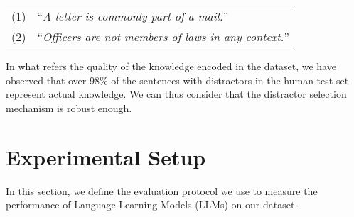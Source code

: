 \documentclass[11pt]{article}
\begin{document}
\begin{table}[h]
    \centering
    \begin{tabular}{lp{6cm}}
        (1) & ``{\it A letter is commonly part of a mail.}'' \\
        (2) & ``{\it Officers are not members of laws in any context.}''
\end{tabular}
\end{table}

In what refers the quality of the knowledge encoded in the dataset, we have observed that over 98\% of the sentences with distractors in the human test set represent actual knowledge. We can thus consider that the distractor selection mechanism is robust enough. 










    















\section{Experimental Setup}
\label{sec:ExperimentalSetup}
In this section, we define the evaluation protocol we use to measure the performance of Language Learning Models (LLMs) on our dataset.
\end{document}

